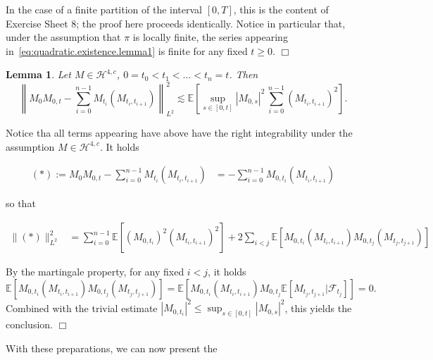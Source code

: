 \documentclass{article}
\newcommand{\coloneq}{:=}
\newcommand{\textbf}[1]{\text{{\bfseries{#1}}}}
\newenvironment{proof}{\noindent\textbf{Proof\ }}{\hspace*{\fill}$\Box$\medskip}
\newtheorem{lemma}{Lemma}
\newcommand{\1}{\1}
\begin{document}
{\begin{proof}
  In the case of a finite partition of the interval $[0, T]$, this is the
  content of Exercise Sheet 8; the proof here proceeds identically. Notice in
  particular that, under the assumption that $\pi$ is locally finite, the
  series appearing in~\eqref{eq:quadratic.existence.lemma1} is finite for any
  fixed $t \geqslant 0$.
\end{proof}

\begin{lemma}
  \label{lem:quadratic.existence.lemma2}Let $M \in \mathcal{H}^{4, c}$, $0 =
  t_0 < t_1 < \ldots < t_n = t$. Then
  \[ \left\| M_0 M_{0, t} - \sum_{i = 0}^{n - 1} M_{t_i} (M_{t_i, t_{i + 1}})
     \right\|_{L^2}^2 \lesssim \mathbb{E} \left[ \sup_{s \in [0, t]} | M_{0,
     s} |^2 \, \sum_{i = 0}^{n - 1} (M_{t_i, t_{i + 1}})^2 \right] . \]
\end{lemma}

\begin{proof}
  Notice tha all terms appearing have above have the right integrability under
  the assumption $M \in \mathcal{H}^{4, c}$. It holds
  
  \begin{align*}
    (*) \coloneq M_0 M_{0, t} - \sum_{i = 0}^{n - 1} M_{t_i} (M_{t_i, t_{i +
    1}}) & = - \sum_{i = 0}^{n - 1} M_{0, t_i} (M_{t_i, t_{i + 1}})
  \end{align*}
  
  so that
  
  \begin{align*}
    \| (*) \|_{L^2}^2 & = \sum_{i = 0}^{n - 1} \mathbb{E} [(M_{0, t_i})^2
    (M_{t_i, t_{i + 1}})^2] + 2 \sum_{i < j} \mathbb{E} [M_{0, t_i} (M_{t_i,
    t_{i + 1}}) M_{0, t_j} (M_{t_j, t_{j + 1}})]
  \end{align*}
  
  By the martingale property, for any fixed $i < j$, it holds
  \begin{equation}
    \mathbb{E} [M_{0, t_i} (M_{t_i, t_{i + 1}}) M_{0, t_j} (M_{t_j, t_{j +
    1}})] =\mathbb{E} [M_{0, t_i} (M_{t_i, t_{i + 1}}) M_{0, t_j} \mathbb{E}
    [M_{t_j, t_{j + 1}} | \mathcal{F}_{t_j}]] = 0.
    \label{eq:higher.orthogonality}
  \end{equation}
  Combined with the trivial estimate $| M_{0, t_i} |^2 \leqslant \sup_{s \in
  [0, t]} | M_{0, s} |^2$, this yields the conclusion.
\end{proof}

With these preparations, we can now present the

}
\end{document}
